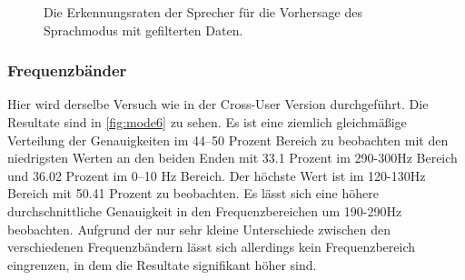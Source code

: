 \begin{figure}[H]
\caption{Die Erkennungsraten der Sprecher  für die Vorhersage des Sprachmodus mit gefilterten Daten.}
\label{fig:cnfsfiltered}
\end{figure}


\subsubsection{Frequenzbänder}
Hier wird derselbe Versuch wie in der Cross-User Version durchgeführt. Die Resultate sind in \ref{fig:mode6} zu sehen. Es ist eine ziemlich gleichmäßige Verteilung der Genauigkeiten im 44–50 Prozent Bereich zu beobachten mit den niedrigsten Werten an den beiden Enden mit 33.1 Prozent im 290-300Hz Bereich und 36.02 Prozent im 0–10 Hz Bereich. Der höchste Wert ist im 120-130Hz Bereich mit 50.41 Prozent zu beobachten. Es lässt sich eine höhere durchschnittliche Genauigkeit in den Frequenzbereichen um 190-290Hz beobachten. Aufgrund der nur sehr kleine Unterschiede zwischen den verschiedenen Frequenzbändern lässt sich allerdings kein Frequenzbereich eingrenzen, in dem die Resultate signifikant höher sind.

